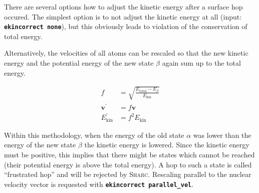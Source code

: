 \documentclass[a4paper,11pt,DIV=15,openany,twoside=false]{scrbook}
\newcommand{\tthdump}[1]{#1}
\newcommand{\sharc}{\textsc{Sharc}}
\newcommand{\ttt}[1]{\textbf{\texttt{#1}}}
\newcommand{\VEC}[1]{\ensuremath{\mathbf{#1}}}
\begin{document}
There are several options how to adjust the kinetic energy after a surface hop occured. The simplest option is to not adjust the kinetic energy at all (input: \ttt{ekincorrect none}), but this obviously leads to violation of the conservation of total energy.

Alternatively, the velocities of all atoms can be rescaled so that the new kinetic energy and the potential energy of the new state $\beta$ again sum up to the total energy.
\tthdump{
  \begin{align}
    f&=\sqrt{\frac{E_{\text{total}}-E_\beta}{E_{\text{kin}}}}\\
    \VEC{v}^\prime&=f\VEC{v}\\
    E_{\text{kin}}^\prime&=f^2E_{\text{kin}}
  \end{align}
}
Within this methodology, when the energy of the old state $\alpha$ was lower than the energy of the new state $\beta$ the kinetic energy is lowered. Since the kinetic energy must be positive, this implies that there might be states which cannot be reached (their potential energy is above the total energy). A hop to such a state is called ``frustrated hop'' and will be rejected by \sharc. Rescaling parallel to the nuclear velocity vector is requested with \ttt{ekincorrect parallel\_vel}.
\end{document}

